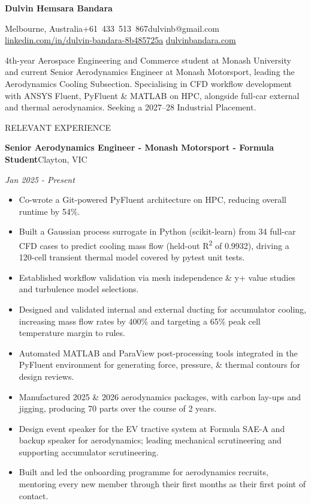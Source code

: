 \documentclass[10pt,a4paper]{article}
\newcommand{\cvsection}[1]{%
  \vspace{7pt}%
  {\large\color{accent}\uppercase{#1}}\par
  \vspace{2pt}{\color{accent}\hrule height 1.1pt}\vspace{3pt}}
\newcommand{\cvorg}[2]{\textbf{#1}\hfill #2\par}
\newcommand{\cvrole}[2]{\textit{#1}\hfill \textit{#2}\par}
\newenvironment{cvitems}{%
  \begin{itemize}[leftmargin=1.6em,labelsep=0.6em,itemsep=1pt,topsep=3pt,parsep=0pt,partopsep=0pt]}%
  {\end{itemize}\vspace{1pt}}
\newcommand{\sep}{\enspace\textbullet\enspace}
\begin{document}
\begin{center}
  {\LARGE\bfseries Dulvin Hemsara Bandara}\par
  \vspace{4pt}
  {\footnotesize
  Melbourne, Australia\sep +61~433~513~867\sep dulvinb@gmail.com\sep
  \href{https://www.linkedin.com/in/dulvin-bandara-8b485725a}{\color{link}\underline{linkedin.com/in/dulvin-bandara-8b485725a}}\sep
  \href{https://dulvinbandara.com}{\color{link}\underline{dulvinbandara.com}}\par}
  \vspace{9pt}
  4th-year Aerospace Engineering and Commerce student at Monash University and current Senior Aerodynamics
  Engineer at Monash Motorsport, leading the Aerodynamics Cooling Subsection. Specialising in CFD workflow
  development with ANSYS Fluent, PyFluent \& MATLAB on HPC, alongside full-car external and thermal
  aerodynamics. Seeking a 2027--28 Industrial Placement.\par
\end{center}

\cvsection{Relevant Experience}

\cvorg{Senior Aerodynamics Engineer - Monash Motorsport - Formula Student}{Clayton, VIC}
\cvrole{}{Jan 2025 - Present}
\begin{cvitems}
  \item Co-wrote a Git-powered PyFluent architecture on HPC, reducing overall runtime by 54\%.
  \item Built a Gaussian process surrogate in Python (scikit-learn) from 34 full-car CFD cases to predict cooling
        mass flow (held-out R\textsuperscript{2} of 0.9932), driving a 120-cell transient thermal model covered by pytest unit tests.
  \item Established workflow validation via mesh independence \& y+ value studies and turbulence model selections.
  \item Designed and validated internal and external ducting for accumulator cooling, increasing mass flow rates by
        400\% and targeting a 65\% peak cell temperature margin to rules.
  \item Automated MATLAB and ParaView post-processing tools integrated in the PyFluent environment for
        generating force, pressure, \& thermal contours for design reviews.
  \item Manufactured 2025 \& 2026 aerodynamics packages, with carbon lay-ups and jigging, producing 70 parts over
        the course of 2 years.
  \item Design event speaker for the EV tractive system at Formula SAE-A and backup speaker for aerodynamics;
        leading mechanical scrutineering and supporting accumulator scrutineering.
  \item Built and led the onboarding programme for aerodynamics recruits, mentoring every new member through
        their first months as their first point of contact.
\end{cvitems}
\end{document}
